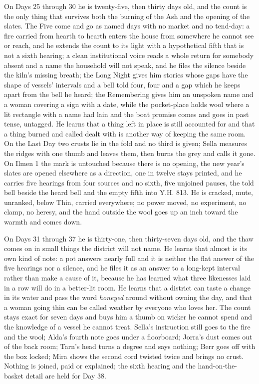 \documentclass{design/chronicle}
\begin{document}
{On Days 25 through 30 he is twenty-five, then thirty days old, and the count is the only thing that survives both the burning of the Ash and the opening of the slates. The Five come and go as named days with no market and no tend-day: a fire carried from hearth to hearth enters the house from somewhere he cannot see or reach, and he extends the count to its light with a hypothetical fifth that is not a sixth hearing; a clean institutional voice reads a whole return for somebody absent and a name the household will not speak, and he files the silence beside the kiln’s missing breath; the Long Night gives him stories whose gaps have the shape of vessels’ intervals and a bell told four, four and a gap which he keeps apart from the bell he heard; the Remembering gives him an unspoken name and a woman covering a sign with a date, while the pocket-place holds wool where a lit rectangle with a name had lain and the boat promise comes and goes in past tense, untagged. He learns that a thing left in place is still accounted for and that a thing burned and called dealt with is another way of keeping the same room. On the Last Day two crusts lie in the fold and no third is given; Sella measures the ridges with one thumb and leaves them, then burns the grey and calls it gone. On Ilmen 1 the mark is untouched because there is no opening, the new year’s slates are opened elsewhere as a direction, one in twelve stays printed, and he carries five hearings from four sources and no sixth, five unjoined pauses, the told bell beside the heard bell and the empty fifth into Y.H. 813. He is cracked, mute, unranked, below Thin, carried everywhere; no power moved, no experiment, no clamp, no heresy, and the hand outside the wool goes up an inch toward the warmth and comes down.

On Days 31 through 37 he is thirty-one, then thirty-seven days old, and the thaw comes on in small things the district will not name. He learns that almost is its own kind of note: a pot answers nearly full and it is neither the flat answer of the five hearings nor a silence, and he files it as an answer to a long-kept interval rather than make a cause of it, because he has learned what three likenesses laid in a row will do in a better-lit room. He learns that a district can taste a change in its water and pass the word \emph{honeyed} around without owning the day, and that a woman going thin can be called weather by everyone who loves her. The count stays exact for seven days and buys him a thumb on wicker he cannot spend and the knowledge of a vessel he cannot treat. Sella’s instruction still goes to the fire and the wool; Alda’s fourth note goes under a floorboard; Jorra’s dust comes out of the back room; Tarn’s head turns a degree and says nothing; Berr goes off with the box locked; Mira shows the second cord twisted twice and brings no crust. Nothing is joined, paid or explained; the sixth hearing and the hand-on-the-basket detail are held for Day 38.

}
\end{document}
